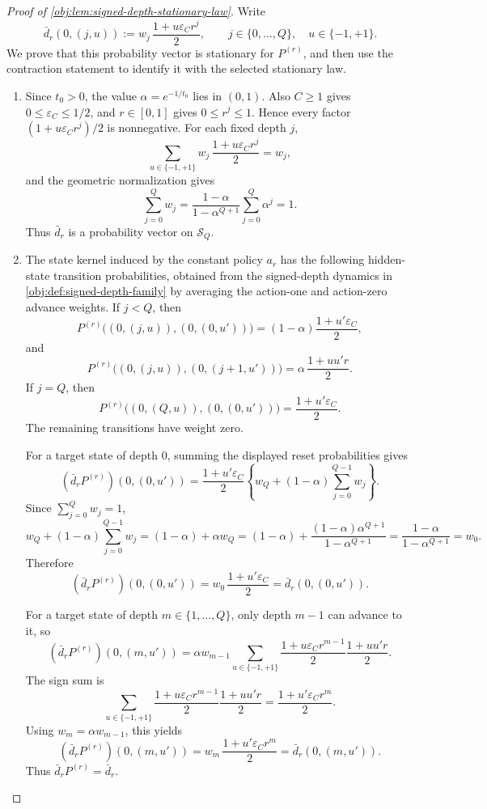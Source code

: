 \documentclass[11pt]{article}
\begin{document}
\begin{proof}[Proof of \cref{obj:lem:signed-depth-stationary-law}]
Write
\[
\bar d_r(0,(j,u))
:=
w_j\,\frac{1+u\varepsilon_C r^j}{2},
\qquad
j\in\{0,\ldots,Q\},\quad u\in\{-1,+1\}.
\]
We prove that this probability vector is stationary for \(P^{(r)}\), and then use the
contraction statement to identify it with the selected stationary law.

\begin{enumerate}
\item Since \(t_0>0\), the value \(\alpha=e^{-1/t_0}\) lies in \((0,1)\). Also
\(C\ge 1\) gives \(0\le \varepsilon_C\le 1/2\), and \(r\in[0,1]\) gives
\(0\le r^j\le 1\). Hence every factor
\((1+u\varepsilon_C r^j)/2\) is nonnegative. For each fixed depth \(j\),
\[
\sum_{u\in\{-1,+1\}}
w_j\,\frac{1+u\varepsilon_C r^j}{2}
=w_j,
\]
and the geometric normalization gives
\[
\sum_{j=0}^Q w_j
=
\frac{1-\alpha}{1-\alpha^{Q+1}}\sum_{j=0}^Q \alpha^j
=1.
\]
Thus \(\bar d_r\) is a probability vector on \(\mathcal S_Q\). %

\item The state kernel induced by the constant policy \(a_r\) has the following
hidden-state transition probabilities, obtained from the signed-depth dynamics in
\cref{obj:def:signed-depth-family} by averaging the action-one and action-zero
advance weights. If \(j<Q\), then
\[
P^{(r)}\bigl((0,(j,u)),(0,(0,u'))\bigr)
=(1-\alpha)\frac{1+u'\varepsilon_C}{2},
\]
and
\[
P^{(r)}\bigl((0,(j,u)),(0,(j+1,u'))\bigr)
=
\alpha\,\frac{1+uu'r}{2}.
\]
If \(j=Q\), then
\[
P^{(r)}\bigl((0,(Q,u)),(0,(0,u'))\bigr)
=
\frac{1+u'\varepsilon_C}{2}.
\]
The remaining transitions have weight zero. %

For a target state of depth \(0\), summing the displayed reset probabilities gives
\[
(\bar d_rP^{(r)})(0,(0,u'))
=
\frac{1+u'\varepsilon_C}{2}
\left\{
w_Q+(1-\alpha)\sum_{j=0}^{Q-1}w_j
\right\}.
\]
Since \(\sum_{j=0}^Q w_j=1\),
\[
w_Q+(1-\alpha)\sum_{j=0}^{Q-1}w_j
=
(1-\alpha)+\alpha w_Q
=
(1-\alpha)+
\frac{(1-\alpha)\alpha^{Q+1}}{1-\alpha^{Q+1}}
=
\frac{1-\alpha}{1-\alpha^{Q+1}}
=w_0.
\]
Therefore
\[
(\bar d_rP^{(r)})(0,(0,u'))
=
w_0\,\frac{1+u'\varepsilon_C}{2}
=
\bar d_r(0,(0,u')).
\]

For a target state of depth \(m\in\{1,\ldots,Q\}\), only depth \(m-1\) can advance
to it, so
\[
(\bar d_rP^{(r)})(0,(m,u'))
=
\alpha w_{m-1}
\sum_{u\in\{-1,+1\}}
\frac{1+u\varepsilon_C r^{m-1}}{2}
\frac{1+uu'r}{2}.
\]
The sign sum is
\[
\sum_{u\in\{-1,+1\}}
\frac{1+u\varepsilon_C r^{m-1}}{2}
\frac{1+uu'r}{2}
=
\frac{1+u'\varepsilon_C r^m}{2}.
\]
Using \(w_m=\alpha w_{m-1}\), this yields
\[
(\bar d_rP^{(r)})(0,(m,u'))
=
w_m\,\frac{1+u'\varepsilon_C r^m}{2}
=
\bar d_r(0,(m,u')).
\]
Thus \(\bar d_rP^{(r)}=\bar d_r\). %


\end{enumerate}
\end{proof}
\end{document}
